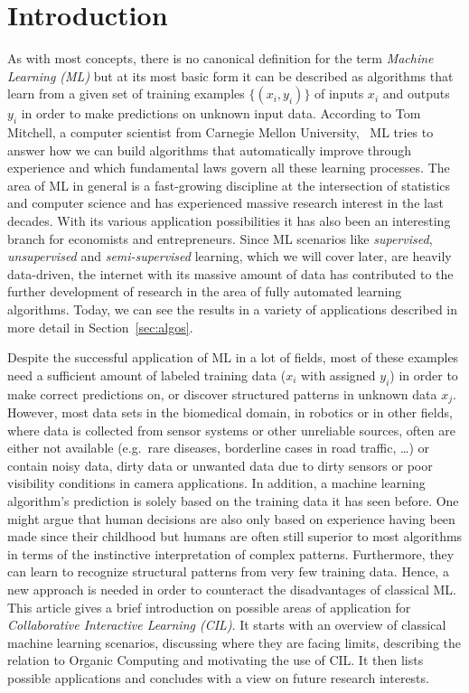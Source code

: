 \documentclass[conference]{IEEEtran}
\begin{document}
\section{Introduction}\label{sec:intro}
As with most concepts, there is no canonical 
definition for the term \textit{Machine Learning (ML)} but at its most basic form it 
can be described as algorithms that learn from a given set of training examples 
$\{(x_i, y_i)\}$ of inputs $x_i$ and outputs $y_i$ in order to 
make predictions on unknown input data. According to Tom 
Mitchell, a computer scientist from Carnegie Mellon University,  ML tries 
to answer how we can build algorithms that automatically improve through 
experience and which fundamental laws govern all these learning processes\cite{ML:mitchell}.
The area of ML in general is a fast-growing discipline at the intersection of statistics 
and computer science and has experienced massive research interest in the last decades.
With its various application possibilities it has also been an interesting branch for 
economists and entrepreneurs.
Since ML scenarios like \textit{supervised}, \textit{unsupervised} and 
\textit{semi-supervised} learning, which we will cover later, are heavily data-driven, 
the internet with its massive amount of data has contributed to the further development 
of research in the area of fully automated learning algorithms. Today, we can see the 
results in a variety of applications\cite{FoundationsOfML:mohri}\cite{DisciplineOfML:mitchell} 
described in more detail in Section~\ref{sec:algos}.


Despite the successful application of ML in a lot of fields, most of these examples 
need a sufficient amount of labeled training data ($x_i$ with assigned $y_i$) in order to make 
correct predictions on, or discover structured patterns in unknown data $x_j$. However, most 
data sets in the biomedical domain, in robotics or in other fields, where data is collected 
from sensor systems or other unreliable sources, often are either not available (e.g.\ rare 
diseases, borderline cases in road traffic, \dots) or contain noisy data, dirty data or unwanted 
data due to dirty sensors or poor visibility conditions in camera applications.
In addition, a machine learning algorithm's prediction is solely based on the training data it 
has seen before. One might argue that human decisions are also only based on experience having been
made since their childhood but humans are often still superior to most algorithms in terms of 
the instinctive interpretation of complex patterns. Furthermore, they can learn to recognize 
structural patterns from very few training data. Hence, a new approach is needed in order to 
counteract the disadvantages of classical ML\@.
This article gives a brief introduction on possible areas of application for 
\textit{Collaborative Interactive Learning (CIL)}. It starts with an overview of classical 
machine learning scenarios, discussing where they are facing limits, describing the relation 
to Organic Computing and motivating the use of CIL\@. It then lists possible applications 
and concludes with a view on future research interests.
\end{document}
